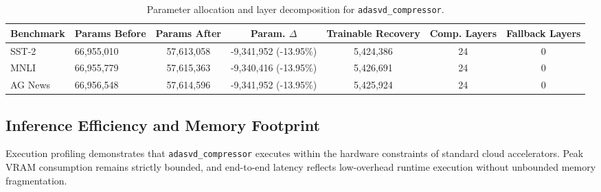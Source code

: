 \begin{table}[t]
\centering
\small
\begin{tabular}{llccccc}
\toprule
\textbf{Benchmark} & \textbf{Params Before} & \textbf{Params After} & \textbf{Param. $\Delta$} & \textbf{Trainable Recovery} & \textbf{Comp. Layers} & \textbf{Fallback Layers} \\
\midrule
SST-2 & 66,955,010 & 57,613,058 & -9,341,952 (-13.95\%) & 5,424,386 & 24 & 0 \\
MNLI & 66,955,779 & 57,615,363 & -9,340,416 (-13.95\%) & 5,426,691 & 24 & 0 \\
AG News & 66,956,548 & 57,614,596 & -9,341,952 (-13.95\%) & 5,425,924 & 24 & 0 \\
\bottomrule
\end{tabular}
\caption{Parameter allocation and layer decomposition for \texttt{adasvd\_compressor}.}
\label{tab:params\_adasvd\_compressor}
\end{table}

\subsection{Inference Efficiency and Memory Footprint}
Execution profiling demonstrates that \texttt{adasvd\_compressor} executes within the hardware constraints of standard cloud accelerators. Peak VRAM consumption remains strictly bounded, and end-to-end latency reflects low-overhead runtime execution without unbounded memory fragmentation.
